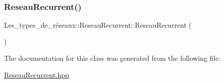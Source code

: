 \subsubsection{\texorpdfstring{Reseau\+Recurrent()}{ReseauRecurrent()}}
{\footnotesize\ttfamily Les\+\_\+types\+\_\+de\+\_\+réseaux\+::\+Reseau\+Recurrent\+::\+Reseau\+Recurrent (\begin{DoxyParamCaption}{ }\end{DoxyParamCaption})}



The documentation for this class was generated from the following file\+:\begin{DoxyCompactItemize}
\item 
\hyperlink{_reseau_recurrent_8hpp}{Reseau\+Recurrent.\+hpp}\end{DoxyCompactItemize}
